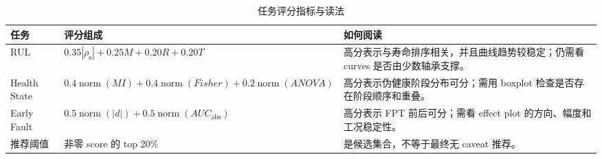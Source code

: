 \begin{table}[htbp]
\centering
\caption{任务评分指标与读法}
\label{tab:ranking_metric_summary}
\scriptsize
\begin{tabularx}{\textwidth}{lYY}
\toprule
任务 & 评分组成 & 如何阅读 \\
\midrule
RUL & \(0.35|\rho_{\mathrm{s}}|+0.25M+0.20R+0.20T\) & 高分表示与寿命排序相关，并且曲线趋势较稳定；仍需看 curves 是否由少数轴承支撑。\\
Health State & \(0.4\operatorname{norm}(MI)+0.4\operatorname{norm}(Fisher)+0.2\operatorname{norm}(ANOVA)\) & 高分表示伪健康阶段分布可分；需用 boxplot 检查是否存在阶段顺序和重叠。\\
Early Fault & \(0.5\operatorname{norm}(|d|)+0.5\operatorname{norm}(AUC_{\mathrm{abs}})\) & 高分表示 FPT 前后可分；需看 effect plot 的方向、幅度和工况稳定性。\\
推荐阈值 & 非零 score 的 top 20\% &  是候选集合，不等于最终无 caveat 推荐。\\
\bottomrule
\end{tabularx}
\end{table}
